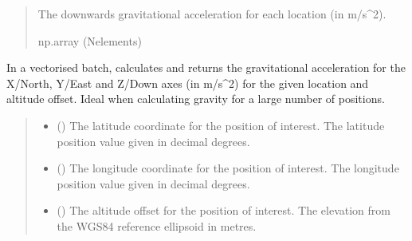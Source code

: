 \documentclass[letterpaper,10pt,english]{sphinxmanual}
\begin{document}
\begin{fulllineitems}
\begin{fulllineitems}
\begin{quote}
\begin{description}
\begin{itemize}
\end{itemize}

\sphinxAtStartPar
The downwards gravitational acceleration for each location
(in m/s\textasciicircum{}2).

\sphinxAtStartPar
np.array (N\sphinxhyphen{}elements)

\end{description}\end{quote}

\end{fulllineitems}


\begin{fulllineitems}
\label{\detokenize{modules/gravity/somigliana:qnav.gravity.somigliana.Somigliana.calc_gravity_xyz_vec}}
\pysigstartsignatures
{}
\pysigstopsignatures
\sphinxAtStartPar
In a vectorised batch, calculates and returns the gravitational
acceleration for the X/North, Y/East and Z/Down axes (in m/s\textasciicircum{}2)
for the given location and altitude offset. Ideal when calculating
gravity for a large number of positions.
\begin{quote}\begin{description}
\begin{itemize}
\item {} 
\sphinxAtStartPar
{} () \textendash{} The latitude coordinate for the position of interest.
The latitude position value given in decimal degrees.

\item {} 
\sphinxAtStartPar
{} () \textendash{} The longitude coordinate for the position of interest.
The longitude position value given in decimal degrees.

\item {} 
\sphinxAtStartPar
{} () \textendash{} The altitude offset for the position of interest.
The elevation from the WGS\sphinxhyphen{}84 reference ellipsoid in metres.


\end{itemize}
\end{description}
\end{quote}
\end{fulllineitems}
\end{fulllineitems}
\end{document}
